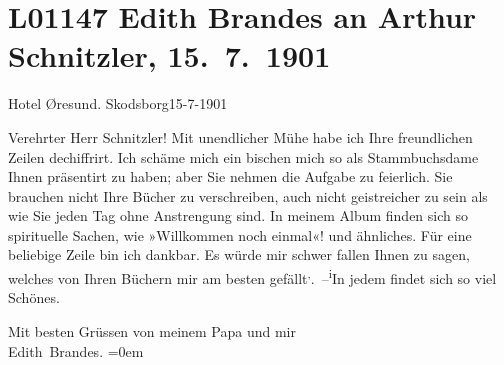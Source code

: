 

\section[Edith Brandes an Arthur Schnitzler, 15. 7. 1901]{L01147 Edith Brandes an Arthur Schnitzler, 15. 7. 1901}
\nopagebreak{}
\rehead{ }\normalsize\beginnumbering{}
\toendnotes[C]{\smallbreak\pagebreak[2]}
\toendnotes[C]{\smallbreak}
\pstart
           \raggedleft{}{\pb}Hotel Øresund. Skodsborg15-7-1901\pend
           
\pstart\center{}Verehrter Herr Schnitzler!\pend\vspace{0.5em}
\pstart
           Mit unendlicher Mühe habe ich Ihre freundlichen Zeilen dechiffrirt. Ich schäme mich
               ein bischen mich so als Stammbuchsdame Ihnen präsentirt zu haben; aber Sie nehmen die
               Aufgabe {\pb}zu feierlich. Sie
               brauchen nicht Ihre Bücher zu verschreiben, auch nicht geistreicher zu sein als wie
               Sie jeden Tag ohne Anstrengung sind. In meinem Album finden sich so spirituelle
               Sachen, wie »Willkommen noch einmal«! und ähnliches. Für eine beliebige Zeile bin ich
               dankbar. Es würde mir schwer fallen Ihnen zu sagen, welches von Ihren Büchern mir am
               besten gefällt\substVorne{}\textsuperscript{,}\substDazwischen{}. –\substHinten{}{ }\substVorne{}\textsuperscript{i}\substDazwischen{}I\substHinten{}n jedem findet sich so viel Schönes.\pend
           
\pstart
           {\pb}Mit besten Grüssen von meinem Papa und mir{\\[\baselineskip]}\spacefill\mbox{Edith Brandes.}\pend
           \leftskip=0em{}\endnumbering{}  
      